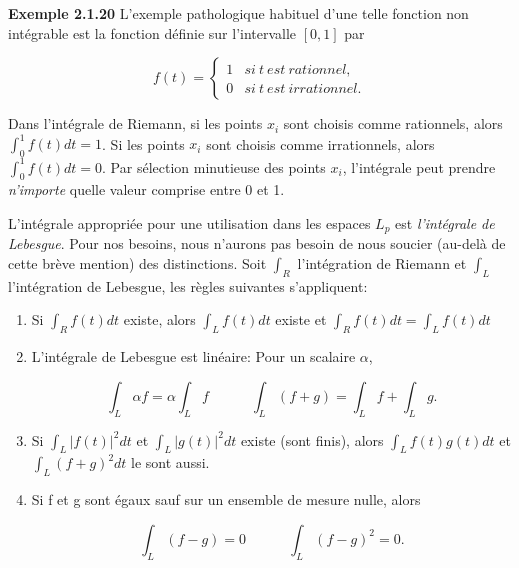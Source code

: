 \documentclass[10pt,twoside,a4paper]{book}
\begin{document}
\begin{enumerate}
  \vspace{4mm}
  \noindent
  \textbf{Exemple 2.1.20} L'exemple pathologique habituel d'une telle fonction non intégrable est la fonction définie sur l'intervalle $[0, 1]$ par

  \begin{equation}
    f(t) = \begin{cases} 1 & si \ t \ est \ rationnel, \\
      0 &  si \ t \ est \ irrationnel.
          \end{cases}
  \end{equation}

  \noindent
  Dans l'intégrale de Riemann, si les points $x_i$ sont choisis comme rationnels, alors $\int_{0}^{1}f(t)dt = 1$. Si les points $x_i$ sont choisis comme irrationnels, alors $\int_{0}^{1}f(t)dt = 0$. Par sélection minutieuse des points $x_i$, l'intégrale peut prendre \textit{n'importe} quelle valeur comprise entre 0 et 1.
  \vspace{4mm}

  \noindent
  L'intégrale appropriée pour une utilisation dans les espaces $L_p$ est \textit{l'intégrale de Lebesgue}. Pour nos besoins, nous n'aurons pas besoin de nous soucier (au-delà de cette brève mention) des distinctions. Soit $\int_{R}$ l'intégration de Riemann et $\int_{L}$ l'intégration de Lebesgue, les règles suivantes s'appliquent:

  \begin{enumerate}
    \item Si $\int_{R}f(t)dt$ existe, alors $\int_{L}f(t)dt$ existe et $\int_{R}f(t)dt = \int_{L}f(t)dt$
    \item L'intégrale de Lebesgue est linéaire: Pour un scalaire $\alpha$,
    
    \begin{equation*}
      \int_L \alpha f = \alpha \int_L f  \quad \quad \quad  \int_L (f + g) = \int_L f + \int_L g .
    \end{equation*}

    \item Si $\int_L |f(t)|^2 dt$ et $\int_L |g(t)|^2 dt$ existe (sont finis), alors $\int_L f(t)g(t)dt$ et $\int_L (f+g)^2 dt$ le sont aussi.
    \item Si f et g sont égaux sauf sur un ensemble de mesure nulle, alors
    
    \begin{equation*}
      \int_L (f - g) = 0  \quad \quad \quad  \int_L (f - g)^2 = 0.
    \end{equation*}


\end{enumerate}
\end{enumerate}
\end{document}
